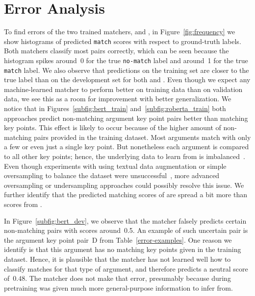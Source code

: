 \section{Error Analysis}\label{error-analysis}




To find errors of the two trained matchers, \BertBase and \RobertaBase, in Figure~\ref{fig:frequency} we show 
histograms of predicted \texttt{match} scores with respect to ground-truth labels.
Both matchers classify most pairs correctly, which can be seen because the histogram spikes around~0 for the 
true \texttt{no-match} label and around~1 for the true \texttt{match} label.
We also observe that predictions on the training set are closer to the true label than on the development set for both \RobertaBase and \BertBase. 
Even though we expect any machine-learned matcher to perform better on training data than on validation data, 
we see this as a room for improvement with better generalization.
We notice that in Figures~\ref{subfig:bert_train} and~\ref{subfig:roberta_train} both approaches predict non-matching 
argument key point pairs better than matching key points.
This effect is likely to occur because of the higher amount of non-matching pairs provided in the training dataset.
Most arguments match with only a few or even just a single key point.
But nonetheless each argument is compared to all other key points; hence, the underlying data to learn from is 
imbalanced~\cite{BarandelaVSF2004}.
Even though experiments with using textual data augmentation or simple oversampling to balance the dataset were 
unsuccessful~\cite{Dietterich1995}, more advanced oversampling or undersampling approaches could possibly resolve this issue.
We further identify that the predicted matching scores of \BertBase are spread a 
bit more than scores from \RobertaBase.

In Figure~\ref{subfig:bert_dev}, we observe that the \BertBase matcher falsely predicts certain non-matching pairs with scores around~0.5.
An example of such uncertain pair is the argument key point pair~D from Table~\ref{error-examples}.
One reason we identify is that this argument has no matching key points given in the training dataset.
Hence, it is plausible that the \mbox{\BertBase} matcher has not learned well how to classify matches for that type of 
argument, and therefore predicts a neutral score of~\(0.48\).
The \RobertaBase matcher does not make that error, presumably because during pretraining \Roberta was given much 
more general-purpose information to infer from.

